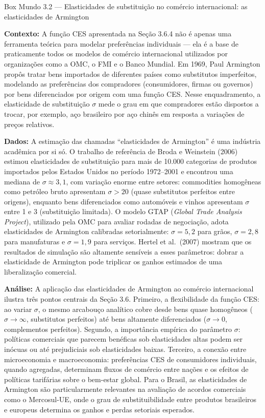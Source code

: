 \documentclass[11pt,twoside,openright]{book}
\begin{document}
\begin{boxmundobox}{Box Mundo 3.2 — Elasticidades de substituição no comércio internacional: as elasticidades de Armington}

\textbf{Contexto:} A função CES apresentada na Seção 3.6.4 não é apenas
uma ferramenta teórica para modelar preferências individuais --- ela é a
base de praticamente todos os modelos de comércio internacional
utilizados por organizações como a OMC, o FMI e o Banco Mundial. Em
1969, Paul Armington propôs tratar bens importados de diferentes países
como substitutos imperfeitos, modelando as preferências dos compradores
(consumidores, firmas ou governos) por bens diferenciados por origem com
uma função CES. Nesse enquadramento, a elasticidade de substituição
\(\sigma\) mede o grau em que compradores estão dispostos a trocar, por
exemplo, aço brasileiro por aço chinês em resposta a variações de preços
relativos.

\textbf{Dados:} A estimação das chamadas ``elasticidades de Armington''
é uma indústria acadêmica por si só. O trabalho de referência de Broda e
Weinstein (2006) estimou elasticidades de substituição para mais de
10.000 categorias de produtos importados pelos Estados Unidos no período
1972--2001 e encontrou uma mediana de \(\sigma \approx 3{,}1\), com
variação enorme entre setores: commodities homogêneas como petróleo
bruto apresentam \(\sigma > 20\) (quase substitutos perfeitos entre
origens), enquanto bens diferenciados como automóveis e vinhos
apresentam \(\sigma\) entre 1 e 3 (substituição limitada). O modelo GTAP
(\emph{Global Trade Analysis Project}), utilizado pela OMC para avaliar
rodadas de negociação, adota elasticidades de Armington calibradas
setorialmente: \(\sigma = 5{,}2\) para grãos, \(\sigma = 2{,}8\) para
manufaturas e \(\sigma = 1{,}9\) para serviços. Hertel et al.~(2007)
mostram que os resultados de simulação são altamente sensíveis a esses
parâmetros: dobrar a elasticidade de Armington pode triplicar os ganhos
estimados de uma liberalização comercial.

\textbf{Análise:} A aplicação das elasticidades de Armington ao comércio
internacional ilustra três pontos centrais da Seção 3.6. Primeiro, a
flexibilidade da função CES: ao variar \(\sigma\), o mesmo arcabouço
analítico cobre desde bens quase homogêneos (\(\sigma \to \infty\),
substitutos perfeitos) até bens altamente diferenciados
(\(\sigma \to 0\), complementos perfeitos). Segundo, a importância
empírica do parâmetro \(\sigma\): políticas comerciais que parecem
benéficas sob elasticidades altas podem ser inócuas ou até prejudiciais
sob elasticidades baixas. Terceiro, a conexão entre microeconomia e
macroeconomia: preferências CES de consumidores individuais, quando
agregadas, determinam fluxos de comércio entre nações e os efeitos de
políticas tarifárias sobre o bem-estar global. Para o Brasil, as
elasticidades de Armington são particularmente relevantes na avaliação
de acordos comerciais como o Mercosul-UE, onde o grau de
substituibilidade entre produtos brasileiros e europeus determina os
ganhos e perdas setoriais esperados.


\end{boxmundobox}
\end{document}
